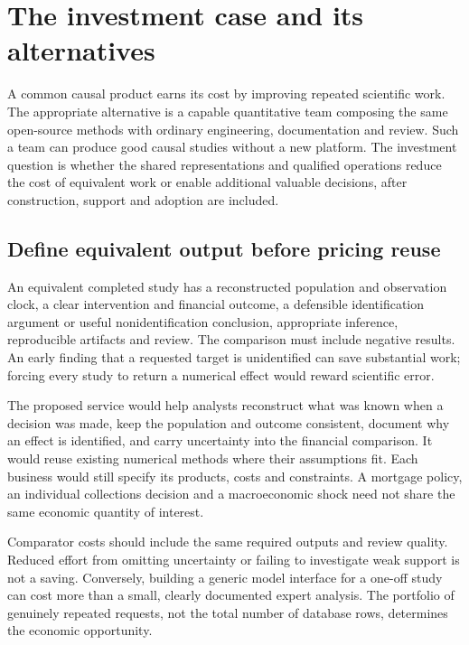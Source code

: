 \chapter{The investment case and its alternatives}
\label{r3:investment}

A common causal product earns its cost by improving repeated scientific
work. The appropriate alternative is a capable quantitative team composing
the same open-source methods with ordinary engineering, documentation and
review. Such a team can produce good causal studies without a new platform.
The investment question is whether the shared representations and qualified
operations reduce the cost of equivalent work or enable additional valuable
decisions, after construction, support and adoption are included.

\section{Define equivalent output before pricing reuse}
\label{r3:equivalent-output}

An equivalent completed study has a reconstructed population and observation
clock, a clear intervention and financial outcome, a defensible identification
argument or useful nonidentification conclusion, appropriate inference,
reproducible artifacts and review. The comparison must include negative
results. An early finding that a requested target is unidentified can save
substantial work; forcing every study to return a numerical effect would
reward scientific error.

The proposed service would help analysts reconstruct what was known when
a decision was made, keep the population and outcome consistent, document
why an effect is identified, and carry uncertainty into the financial
comparison. It would reuse existing numerical methods where their
assumptions fit. Each business would still specify its products, costs and
constraints. A mortgage policy, an individual collections decision and a
macroeconomic shock need not share the same economic quantity of interest.

Comparator costs should include the same required outputs and review
quality. Reduced effort from omitting uncertainty or failing to investigate
weak support is not a saving. Conversely, building a generic model interface
for a one-off study can cost more than a small, clearly documented expert
analysis. The portfolio of genuinely repeated requests, not the total
number of database rows, determines the economic opportunity.

